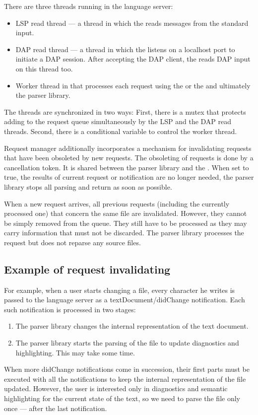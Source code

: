 There are three threads running in the language server:
\begin{itemize}
	\item LSP read thread --- a thread in which the  reads messages from the standard input.
	\item DAP read thread --- a thread in which the  listens on a localhost port to initiate a DAP session. After accepting the DAP client, the  reads DAP input on this thread too.
	\item Worker thread in  that processes each request using the  or the  and ultimately the parser library.
\end{itemize}

The threads are synchronized in two ways: First, there is a mutex that protects adding to the request queue simultaneously by the LSP and the DAP read threads. Second, there is a conditional variable to control the worker thread.

Request manager additionally incorporates a mechanism for invalidating requests that have been obsoleted by new requests. The obsoleting of requests is done by a cancellation token. It is shared between the parser library and the . When set to true, the results of current request or notification are no longer needed, the parser library stops all parsing and return as soon as possible.

When a new request arrives, all previous requests (including the currently processed one) that concern the same file are invalidated. However, they cannot be simply removed from the queue. They still have to be processed as they may carry information that must not be discarded. The parser library processes the request but does not reparse any source files.

\subsection{Example of request invalidating}

For example, when a user starts changing a file, every character he writes is passed to the language server as a textDocument/didChange notification. Each such notification is processed in two stages:
\begin{enumerate}
	\item The parser library changes the internal representation of the text document.
	\item The parser library starts the parsing of the file to update diagnostics and highlighting. This may take some time.
\end{enumerate}
When more didChange notifications come in succession, their first parts must be executed with all the notifications to keep the internal representation of the file updated. However, the user is interested only in diagnostics and semantic highlighting for the current state of the text, so we need to parse the file only once --- after the last notification.



